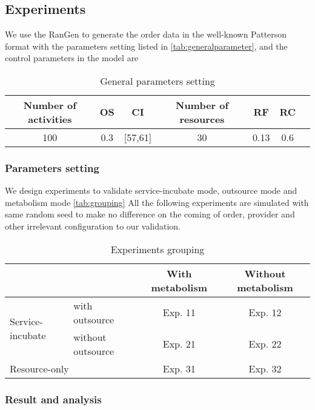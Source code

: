 \subsection{Experiments} %
\label{ssub:case_design}
We use the RanGen\cite{Demeulemeester2003} to generate the order data in the well-known Patterson format with the parameters setting listed in \autoref{tab:generalparameter}, and the control parameters in the model are

\begin{table}[htbp]
  \centering
  \scriptsize
	\caption{General parameters setting}
    \begin{tabular}{ccccccc}
    \toprule
    Number of activities & OS & CI & Number of resources & RF & RC \\
    \midrule
     100  &   0.3    &  [57,61]     &   30     &  0.13     &   0.6     \\
    \bottomrule
    \end{tabular}%
    {}
  \label{tab:generalparameter}%
\end{table}%



\subsubsection{Parameters setting} %
\label{ssub:parameters_setting}
We design experiments to validate service-incubate mode, outsource mode and metabolism mode \autoref{tab:grouping}
All the following experiments are simulated with same random seed to make no difference on the coming of order, provider and other irrelevant configuration to our validation. 



\begin{table}[htbp]
  \centering
  \scriptsize
  \caption{Experiments grouping}
    \begin{tabular}{llcc}
    \toprule
          &       & With metabolism & Without metabolism \\
    \midrule
    \multicolumn{1}{l}{\multirow{2}[0]{*}{Service-incubate}} & with outsource & Exp. 11 &Exp. 12 \\\cline{2-4}
    \multicolumn{1}{l}{} & without outsource & Exp. 21 & Exp. 22 \\\hline
    \multicolumn{2}{l}{Resource-only} & Exp. 31 & Exp. 32 \\
    \bottomrule
    \end{tabular}%
  \label{tab:grouping}%
\end{table}%

\subsubsection{Result and analysis} %
\label{ssub:result_and_analysis}


